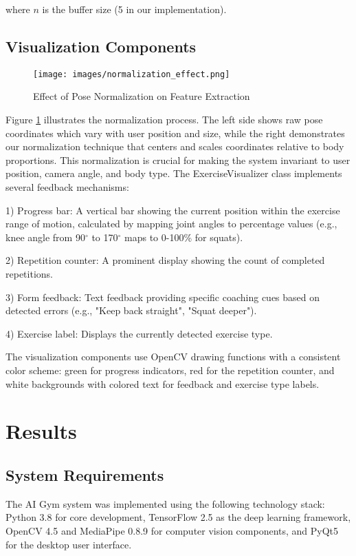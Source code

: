 \documentclass[11pt]{article}
\begin{document}
where $n$ is the buffer size (5 in our implementation).

\subsection{Visualization Components}
\begin{figure}[htbp]
    \centering
    \texttt{[image: images/normalization\_effect.png]}
    \caption{Effect of Pose Normalization on Feature Extraction}
    \label{fig:normalization}
\end{figure}

Figure \ref{fig:normalization} illustrates the normalization process. The left side shows raw pose coordinates which vary with user position and size, while the right demonstrates our normalization technique that centers and scales coordinates relative to body proportions. This normalization is crucial for making the system invariant to user position, camera angle, and body type.
The ExerciseVisualizer class implements several feedback mechanisms:

1) Progress bar: A vertical bar showing the current position within the exercise range of motion, calculated by mapping joint angles to percentage values (e.g., knee angle from 90$^\circ$ to 170$^\circ$ maps to 0-100\% for squats).

2) Repetition counter: A prominent display showing the count of completed repetitions.

3) Form feedback: Text feedback providing specific coaching cues based on detected errors (e.g., "Keep back straight", "Squat deeper").

4) Exercise label: Displays the currently detected exercise type.

The visualization components use OpenCV drawing functions with a consistent color scheme: green for progress indicators, red for the repetition counter, and white backgrounds with colored text for feedback and exercise type labels.

\section{Results}

\subsection{System Requirements}
The AI Gym system was implemented using the following technology stack: Python 3.8 for core development, TensorFlow 2.5 as the deep learning framework, OpenCV 4.5 and MediaPipe 0.8.9 for computer vision components, and PyQt5 for the desktop user interface.
\end{document}
